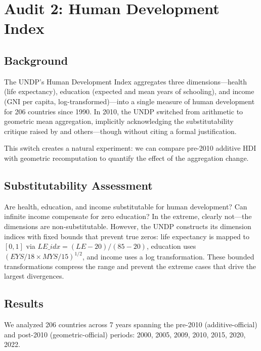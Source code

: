 \documentclass[12pt]{article}
\begin{document}
\section{Audit 2: Human Development Index}

\subsection{Background}

The UNDP's Human Development Index aggregates three dimensions---health (life expectancy), education (expected and mean years of schooling), and income (GNI per capita, log-transformed)---into a single measure of human development for 206 countries since 1990. In 2010, the UNDP switched from arithmetic to geometric mean aggregation, implicitly acknowledging the substitutability critique raised by \citet{sagar1998} and others---though without citing a formal justification.

This switch creates a natural experiment: we can compare pre-2010 additive HDI with geometric recomputation to quantify the effect of the aggregation change.

\subsection{Substitutability Assessment}

Are health, education, and income substitutable for human development? Can infinite income compensate for zero education? In the extreme, clearly not---the dimensions are non-substitutable. However, the UNDP constructs its dimension indices with fixed bounds that prevent true zeros: life expectancy is mapped to $[0,1]$ via $LE\_idx = (LE - 20)/(85 - 20)$, education uses $(EYS/18 \times MYS/15)^{1/2}$, and income uses a log transformation. These bounded transformations compress the range and prevent the extreme cases that drive the largest divergences.

\subsection{Results}

We analyzed 206 countries across 7 years spanning the pre-2010 (additive-official) and post-2010 (geometric-official) periods: 2000, 2005, 2009, 2010, 2015, 2020, 2022.
\end{document}
